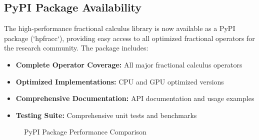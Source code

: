 \subsection{PyPI Package Availability}

The high-performance fractional calculus library is now available as a PyPI package (`hpfracc`), providing easy access to all optimized fractional operators for the research community. The package includes:

\begin{itemize}
    \item \textbf{Complete Operator Coverage:} All major fractional calculus operators
    \item \textbf{Optimized Implementations:} CPU and GPU optimized versions
    \item \textbf{Comprehensive Documentation:} API documentation and usage examples
    \item \textbf{Testing Suite:} Comprehensive unit tests and benchmarks
\end{itemize}

\begin{figure}[h]
\centering
\caption{PyPI Package Performance Comparison}
\label{fig:appendix_pypi_comparison}
\end{figure}
